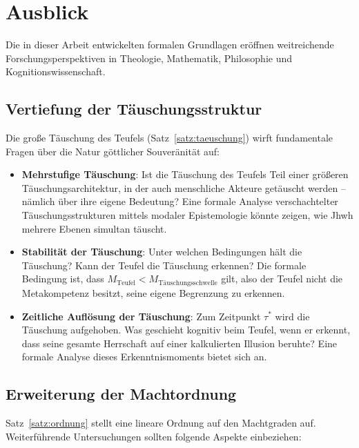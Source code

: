 ﻿\documentclass[a4paper,12pt]{article}
\theoremstyle{definition}
\begin{document}
\section{Ausblick}

Die in dieser Arbeit entwickelten formalen Grundlagen eröffnen weitreichende
Forschungsperspektiven in Theologie, Mathematik, Philosophie und
Kognitionswissenschaft.

\subsection{Vertiefung der Täuschungsstruktur}

Die große Täuschung des Teufels (Satz~\ref{satz:taeuschung}) wirft fundamentale
Fragen über die Natur göttlicher Souveränität auf:

\begin{itemize}
  \item \textbf{Mehrstufige Täuschung}: Ist die Täuschung des Teufels Teil
        einer größeren Täuschungsarchitektur, in der auch menschliche Akteure
        getäuscht werden -- nämlich über ihre eigene Bedeutung? Eine formale
        Analyse verschachtelter Täuschungsstrukturen mittels modaler Epistemologie
        \cite{fagin1995} könnte zeigen, wie Jhwh mehrere Ebenen simultan täuscht.
  \item \textbf{Stabilität der Täuschung}: Unter welchen Bedingungen hält die
        Täuschung? Kann der Teufel die Täuschung erkennen? Die formale
        Bedingung ist, dass $M_{\mathrm{Teufel}} < M_{\text{Täuschungsschwelle}}$
        gilt, also der Teufel nicht die Metakompetenz besitzt, seine eigene
        Begrenzung zu erkennen.
  \item \textbf{Zeitliche Auflösung der Täuschung}: Zum Zeitpunkt $\tau^*$
        wird die Täuschung aufgehoben. Was geschieht kognitiv beim Teufel, wenn
        er erkennt, dass seine gesamte Herrschaft auf einer kalkulierten Illusion
        beruhte? Eine formale Analyse dieses Erkenntnismoments bietet sich an.
\end{itemize}

\subsection{Erweiterung der Machtordnung}

Satz~\ref{satz:ordnung} stellt eine lineare Ordnung auf den Machtgraden auf.
Weiterführende Untersuchungen sollten folgende Aspekte einbeziehen:
\end{document}
